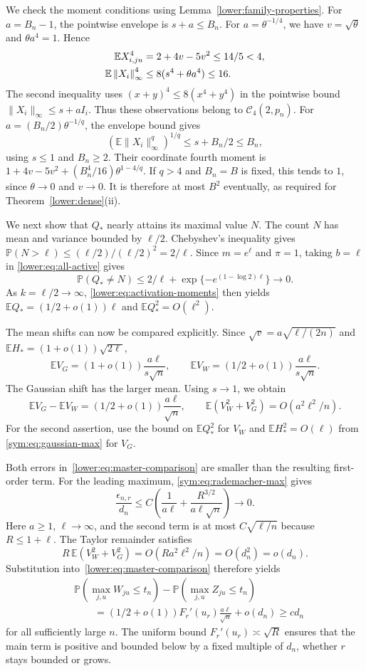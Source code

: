 \documentclass[11pt,letterpaper,twoside,leqno]{article}
\theoremstyle{bookplain}
\theoremstyle{bookremark}
\newcommand{\E}{\mathbb E}
\newcommand{\Pp}{\mathbb P}
\newcommand{\norm}[1]{\left\lVert#1\right\rVert}
\begin{document}
We check the moment conditions using Lemma~\ref{lower:family-properties}.
For $a=B_n-1$, the pointwise envelope is $s+a\le B_n$.
For $a=\theta^{-1/4}$, we have $v=\sqrt\theta$ and
$\theta a^4=1$. Hence
\begin{align}
 \E X_{i,ju}^4&=2+4v-5v^2\le14/5<4,\notag\\
 \E\norm{X_i}_\infty^4&\le8(s^4+\theta a^4)\le16.
 \label{sym:eq:q4-moments}
\end{align}
The second inequality uses $(x+y)^4\le8(x^4+y^4)$ in the
pointwise bound $\|X_i\|_\infty\le s+aI_i$.
Thus these observations belong to $\mathcal C_4(2,p_n)$.
For $a=(B_n/2)\theta^{-1/q}$, the envelope bound gives
\[
 (\E\|X_i\|_\infty^q)^{1/q}\le s+B_n/2\le B_n,
\]
using $s\le1$ and $B_n\ge2$. Their coordinate fourth moment is
$1+4v-5v^2+(B_n^4/16)\theta^{1-4/q}$.
If $q>4$ and $B_n=B$ is fixed, this tends to $1$, since
$\theta\to0$ and $v\to0$. It is therefore at most $B^2$
eventually, as required for Theorem~\ref{lower:dense}\textup{(ii)}.

We next show that $Q_*$ nearly attains its maximal value $N$.
The count $N$ has mean and variance bounded by $\ell/2$.
Chebyshev's inequality gives
$\Pp(N>\ell)\le(\ell/2)/(\ell/2)^2=2/\ell$.
Since $m=e^\ell$ and $\pi=1$, taking $b=\ell$ in
\eqref{lower:eq:all-active} gives
\[
 \Pp(Q_*\ne N)\le2/\ell+
       \exp\{-e^{(1-\log2)\ell}\}\longrightarrow0.
\]
As $k=\ell/2\to\infty$, \eqref{lower:eq:activation-moments}
then yields $\E Q_*=(1/2+o(1))\ell$ and
$\E Q_*^2=O(\ell^2)$.

The mean shifts can now be compared explicitly. Since
$\sqrt v=a\sqrt{\ell/(2n)}$ and
$\E H_*=(1+o(1))\sqrt{2\ell}$,
\[
 \E V_G=(1+o(1))\frac{a\ell}{s\sqrt n},\qquad
 \E V_W=(1/2+o(1))\frac{a\ell}{s\sqrt n}.
\]
The Gaussian shift has the larger mean. Using $s\to1$, we obtain
\[
 \E V_G-\E V_W=(1/2+o(1))\frac{a\ell}{\sqrt n},\qquad
 \E(V_W^2+V_G^2)=O(a^2\ell^2/n).
\]
For the second assertion, use the bound on $\E Q_*^2$ for
$V_W$ and $\E H_*^2=O(\ell)$ from
\eqref{sym:eq:gaussian-max} for $V_G$.

Both errors in~\eqref{lower:eq:master-comparison} are smaller
than the resulting first-order term. For the leading maximum,
\eqref{sym:eq:rademacher-max} gives
\[
 \frac{\epsilon_{n,r}}{d_n}
 \le C\left(\frac1{a\ell}
       +\frac{R^{3/2}}{a\ell\sqrt n}\right)\longrightarrow0.
\]
Here $a\ge1$, $\ell\to\infty$, and the second term is at
most $C\sqrt{\ell/n}$ because $R\le1+\ell$.
The Taylor remainder satisfies
\[
 R\,\E(V_W^2+V_G^2)
 =O(Ra^2\ell^2/n)=O(d_n^2)=o(d_n).
\]
Substitution into~\eqref{lower:eq:master-comparison} therefore yields
\begin{equation}
\begin{split}
 &\Pp(\max_{j,u}W_{ju}\le t_n)-\Pp(\max_{j,u}Z_{ju}\le t_n)\\
 &\qquad=(1/2+o(1))F_r'(u_r)\frac{a\ell}{\sqrt n}
          +o(d_n)\ge c d_n
\end{split}
 \label{sym:eq:common-discrepancy}
\end{equation}
for all sufficiently large $n$. The uniform bound
$F_r'(u_r)\asymp\sqrt R$ ensures that the main term is
positive and bounded below by a fixed multiple of $d_n$, whether
$r$ stays bounded or grows.
\end{document}
